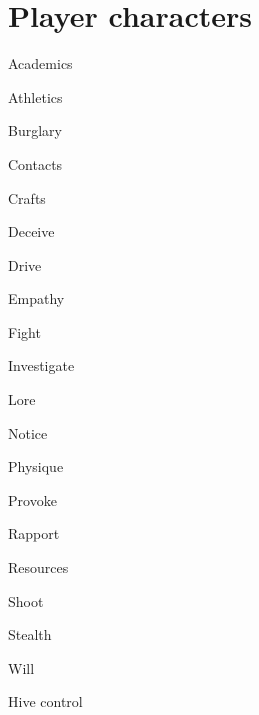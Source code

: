 \section{Player characters}

\begin{npcBox}[title=Chris a Norm adventure therapist]

    \begin{aspects}
    \item {}
    \item {}
    \item {}
    \end{aspects}
    
    \begin{skills}
        \item {} Academics
        \item {} Athletics
        \item {} Burglary
        \item {} Contacts
        \item {} Crafts
        \item {} Deceive
        \item {} Drive
        \item {} Empathy
        \item {} Fight
        \item {} Investigate
        \item {} Lore
        \item {} Notice
        \item {} Physique
        \item {} Provoke
        \item {} Rapport
        \item {} Resources
        \item {} Shoot
        \item {} Stealth
        \item {} Will
        \item {} Hive control
     \end{skills}
    
    \begin{stunts}
    \item {}
    \end{stunts}
    

\end{npcBox}
